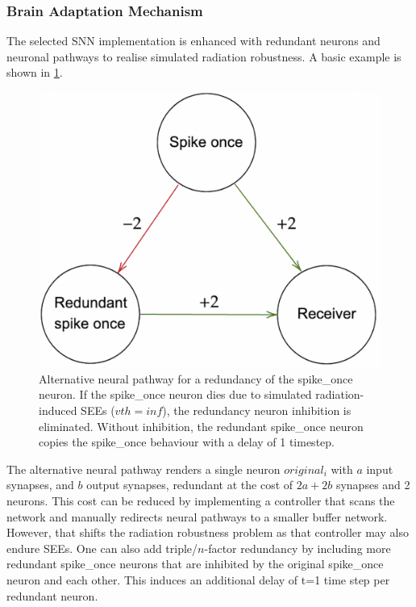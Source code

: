 \subsubsection{Brain Adaptation Mechanism}\label{subsubsec:brain_adaptation_mechanisms}
The selected SNN implementation is enhanced with redundant neurons and neuronal pathways to realise simulated radiation robustness. A basic example is shown in \cref{fig:eg_brain_adaptation}.
\begin{figure}[H]
    \centering
    \includegraphics[width=.5\linewidth]{latex/Images/brain_adaptation_alternative.png}
    \caption{Alternative neural pathway for a redundancy of the spike\_once neuron. If the spike\_once neuron dies due to simulated radiation-induced SEEs ($vth=inf$), the redundancy neuron inhibition is eliminated. Without inhibition, the redundant spike\_once neuron copies the spike\_once behaviour with a delay of 1 timestep.}
    \label{fig:eg_brain_adaptation}
\end{figure}

\noindent The alternative neural pathway renders a single neuron $original_i$ with $a$ input synapses, and $b$ output synapses, redundant at the cost of $2a+2b$ synapses and 2 neurons. This cost can be reduced by implementing a controller that scans the network and manually redirects neural pathways to a smaller buffer network. However, that shifts the radiation robustness problem as that controller may also endure SEEs. %
One can also add triple/$n$-factor redundancy by including more redundant spike\_once neurons that are inhibited by the original spike\_once neuron and each other. This induces an additional delay of t=1 time step per redundant neuron.

